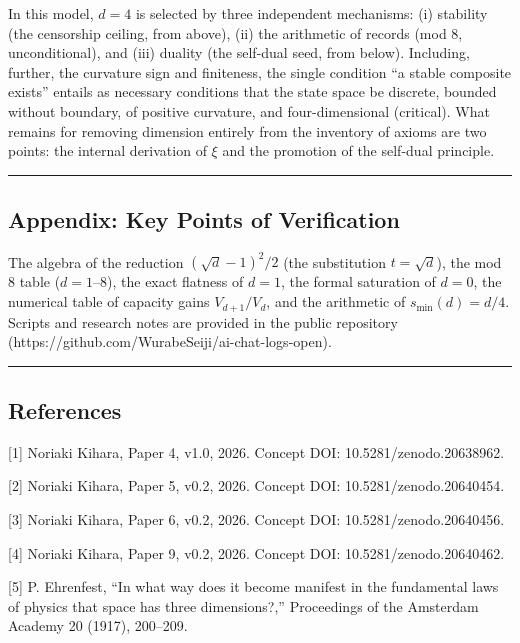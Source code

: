 \documentclass[
]{ltjsarticle}
\begin{document}
In this model, \(d=4\) is selected by three independent mechanisms: (i)
stability (the censorship ceiling, from above), (ii) the arithmetic of
records (mod 8, unconditional), and (iii) duality (the self-dual seed,
from below). Including, further, the curvature sign and finiteness, the
single condition ``a stable composite exists'' entails as necessary
conditions that the state space be discrete, bounded without boundary,
of positive curvature, and four-dimensional (critical). What remains for
removing dimension entirely from the inventory of axioms are two points:
the internal derivation of \(\xi\) and the promotion of the self-dual
principle.

\begin{center}\rule{0.5\linewidth}{0.5pt}\end{center}

\subsection{Appendix: Key Points of
Verification}\label{appendix-key-points-of-verification}

The algebra of the reduction \((\sqrt d-1)^2/2\) (the substitution
\(t=\sqrt d\)), the mod 8 table (\(d=1\)--\(8\)), the exact flatness of
\(d=1\), the formal saturation of \(d=0\), the numerical table of
capacity gains \(V_{d+1}/V_d\), and the arithmetic of
\(s_{\min}(d)=d/4\). Scripts and research notes are provided in the
public repository (https://github.com/WurabeSeiji/ai-chat-logs-open).

\begin{center}\rule{0.5\linewidth}{0.5pt}\end{center}

\subsection{References}\label{references}

{[}1{]} Noriaki Kihara, Paper 4, v1.0, 2026. Concept DOI:
10.5281/zenodo.20638962.

{[}2{]} Noriaki Kihara, Paper 5, v0.2, 2026. Concept DOI:
10.5281/zenodo.20640454.

{[}3{]} Noriaki Kihara, Paper 6, v0.2, 2026. Concept DOI:
10.5281/zenodo.20640456.

{[}4{]} Noriaki Kihara, Paper 9, v0.2, 2026. Concept DOI:
10.5281/zenodo.20640462.

{[}5{]} P. Ehrenfest, ``In what way does it become manifest in the
fundamental laws of physics that space has three dimensions?,''
Proceedings of the Amsterdam Academy 20 (1917), 200--209.
\end{document}
